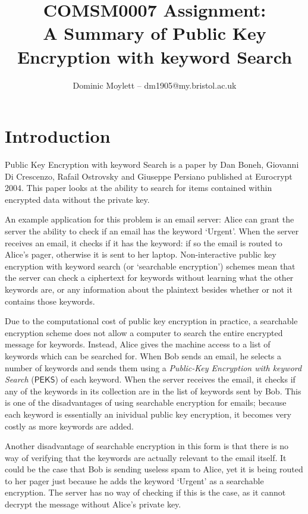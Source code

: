 \documentclass[a4paper,11pt]{article}
\title{COMSM0007 Assignment:\\A Summary of Public Key Encryption with keyword Search}
\author{Dominic Moylett -- dm1905@my.bristol.ac.uk}
\begin{document}
    \maketitle

    \section{Introduction}
    \label{intro}

    Public Key Encryption with keyword Search \cite{cryptoeprint:2003:195} is a paper by Dan Boneh, Giovanni Di Crescenzo, Rafail Ostrovsky and Giuseppe Persiano published at Eurocrypt 2004. This paper looks at the ability to search for items contained within encrypted data without the private key.

    An example application for this problem is an email server: Alice can grant the server the ability to check if an email has the keyword `Urgent'. When the server receives an email, it checks if it has the keyword: if so the email is routed to Alice's pager, otherwise it is sent to her laptop. Non-interactive public key encryption with keyword search (or `searchable encryption') schemes mean that the server can check a ciphertext for keywords without learning what the other keywords are, or any information about the plaintext besides whether or not it contains those keywords.

    Due to the computational cost of public key encryption in practice, a searchable encryption scheme does not allow a computer to search the entire encrypted message for keywords. Instead, Alice gives the machine access to a list of keywords which can be searched for. When Bob sends an email, he selects a number of keywords and sends them using a \textit{Public-Key Encryption with keyword Search} ($\mathsf{PEKS}$) of each keyword. When the server receives the email, it checks if any of the keywords in its collection are in the list of keywords sent by Bob. This is one of the disadvantages of using searchable encryption for emails; because each keyword is essentially an inividual public key encryption, it becomes very costly as more keywords are added.

    Another disadvantage of searchable encryption in this form is that there is no way of verifying that the keywords are actually relevant to the email itself. It could be the case that Bob is sending useless spam to Alice, yet it is being routed to her pager just because he adds the keyword `Urgent' as a searchable encryption. The server has no way of checking if this is the case, as it cannot decrypt the message without Alice's private key.
\end{document}

